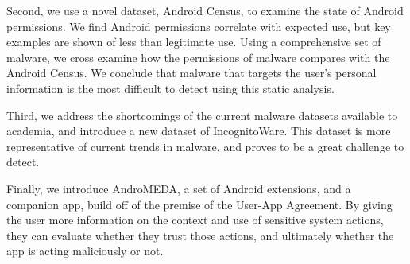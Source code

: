 Second, we use a novel dataset, Android Census, to examine the state of Android permissions. We find Android permissions correlate with expected use, but key examples are shown of less than legitimate use. Using a comprehensive set of malware, we cross examine how the permissions of malware compares with the Android Census. We conclude that malware that targets the user's personal information is the most difficult to detect using this static analysis.

Third, we address the shortcomings of the current malware datasets available to academia, and introduce a new dataset of IncognitoWare. This dataset is more representative of current trends in malware, and proves to be a great challenge to detect. 

Finally, we introduce AndroMEDA, a set of Android extensions, and a companion app, build off of the premise of the User-App Agreement. By giving the user more information on the context and use of sensitive system actions, they can evaluate whether they trust those actions, and ultimately whether the app is acting maliciously or not.






